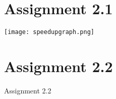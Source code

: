 \documentclass[12pt]{article}
\begin{document}
\maketitle
\section{Assignment 2.1}

\texttt{[image: speedupgraph.png]}

\section{Assignment 2.2}
Assignment 2.2
\end{document}
